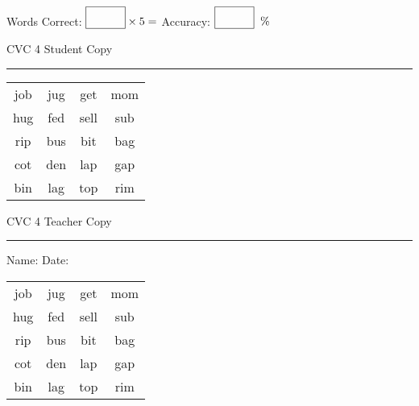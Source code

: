 \documentclass{memoir}
\begin{document}
\normalsize

Words Correct: $\fbox{\phantom{\huge 100}} \times 5 = $ Accuracy: $\fbox{\phantom{\huge 100}}\;\; \%$ 

\vfill

\newpage


\footnotesize \noindent
CVC 4 \hfill Student Copy
\smallskip
\hrule

\huge

\setlength{\tabcolsep}{14pt}
\def\arraystretch{2}

{\selectfont


\begin{vplace}[0.5]
\begin{center}
\begin{tabular}{cccc}
job & jug & get & mom \\
hug & fed & sell & sub \\
rip & bus & bit & bag \\
cot & den & lap & gap \\
bin & lag & top & rim \\
\end{tabular}
\end{center}
\end{vplace}

}

\newpage

\footnotesize \noindent
CVC 4 \hfill Teacher Copy
\smallskip
\hrule

\normalsize

\vfill

\noindent
Name: \underline{\hspace{1.75in}} \hfill Date: \underline{\hspace{1in}}

\huge

{\selectfont


\begin{vplace}[0.5]
\begin{center}
\begin{tabular}{cccc}
job & jug & get & mom \\
hug & fed & sell & sub \\
rip & bus & bit & bag \\
cot & den & lap & gap \\
bin & lag & top & rim \\
\end{tabular}
\end{center}
\end{vplace}



}
\end{document}
